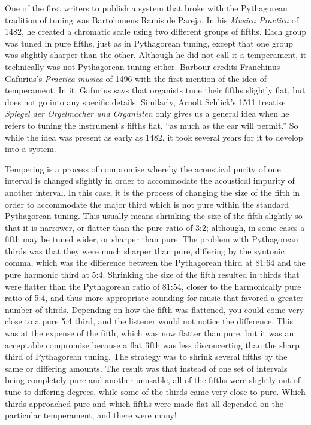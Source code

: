 One of the first writers to publish a system that broke with the Pythagorean
tradition of tuning was Bartolomeus Ramis de Pareja.  In his \textit{Musica Practica} of
1482, he created a chromatic scale using two different groups of fifths.  Each group was
tuned in pure fifths, just as in Pythagorean tuning, except that one group was slightly
sharper than the other. \autocite[88]{MB:1}  Although he did not call it a temperament, it
technically was not Pythagorean tuning either.  Barbour credits Franchinus Gafurius's
\textit{Practica musica} of 1496 with the first mention of the idea of temperament.  In
it, Gafurius says that organists tune their fifths slightly flat, but does not go into any
specific details.\autocite[25]{MB:1} Similarly, Arnolt Schlick's 1511 treatise
\textit{Spiegel der Orgelmacher und Organisten} only gives us a general idea when he
refers to tuning the instrument's fifths flat, ``as much as the ear will permit.''
\autocite[202]{RR:1}  So while the idea was present as early as 1482, it took
several years for it to develop into a system.

Tempering is a process of compromise whereby the acoustical purity of one interval is
changed slightly in order to accommodate the acoustical impurity of another interval.
In this case, it is the process of changing the size of the fifth in order to
accommodate the major third which is not pure within the standard Pythagorean tuning.
This usually means shrinking the size of the fifth slightly so that it is narrower, or
flatter than the pure ratio of 3:2; although, in some cases a fifth may be tuned wider, or
sharper than pure. The problem with Pythagorean thirds was that they were much sharper
than pure, differing by the syntonic comma, which was the difference between the
Pythagorean third at 81:64 and the pure harmonic third at 5:4. Shrinking the size of the
fifth resulted in thirds that were flatter than the Pythagorean ratio of 81:54, closer to
the harmonically pure ratio of 5:4, and thus more appropriate sounding for music that
favored a greater number of thirds. Depending on how the fifth was flattened, you could
come very close to a pure 5:4 third, and the listener would not notice the
difference.  This was at the expense of the fifth, which was now flatter than pure, but it
was an acceptable compromise because a flat fifth was less disconcerting than the
sharp third of Pythagorean tuning.  The strategy was to shrink several fifths by the same
or differing amounts. The result was that instead of one set of intervals being completely
pure and another unusable, all of the fifths were slightly
out-of-tune to differing degrees, while some of the thirds came very close to pure. Which
thirds approached pure and which fifths were made flat all depended on the particular
temperament, and there were many!

